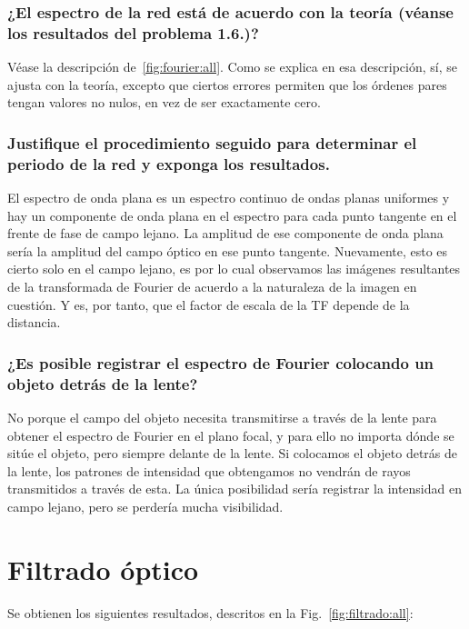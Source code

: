 \documentclass{./packages/optica-article}
\begin{document}
\subsubsection{¿El espectro de la red está de acuerdo con la teoría (véanse los resultados del problema 1.6.)?}
Véase la descripción de~\ref{fig:fourier:all}.
Como se explica en esa descripción, sí, se ajusta con la teoría, excepto que ciertos errores permiten que los órdenes pares tengan valores no nulos, en vez de ser exactamente cero.

\subsubsection{ Justifique el procedimiento seguido para determinar el periodo de la red y exponga los resultados.}
El espectro de onda plana es un espectro continuo de ondas planas uniformes y hay un componente de onda plana en el espectro para cada punto tangente en el frente de fase de campo lejano. La amplitud de ese componente de onda plana sería la amplitud del campo óptico en ese punto tangente. Nuevamente, esto es cierto solo en el campo lejano, es por lo cual observamos las imágenes resultantes de la transformada de Fourier de acuerdo a la naturaleza de la imagen en cuestión. Y es, por tanto, que el factor de escala de la TF depende de la distancia.

\subsubsection{¿Es posible registrar el espectro de Fourier colocando un objeto detrás de la lente?}

No porque el campo del objeto necesita transmitirse a través de la lente para obtener el espectro de Fourier en el plano focal, y para ello no importa dónde se sitúe el objeto, pero siempre delante de la lente. Si colocamos el objeto detrás de la lente, los patrones de intensidad que obtengamos no vendrán de rayos transmitidos a través de esta. La única posibilidad sería registrar la intensidad en campo lejano, pero se perdería mucha visibilidad.



\section{Filtrado óptico}
Se obtienen los siguientes resultados, descritos en la Fig.~\ref{fig:filtrado:all}:
\end{document}
